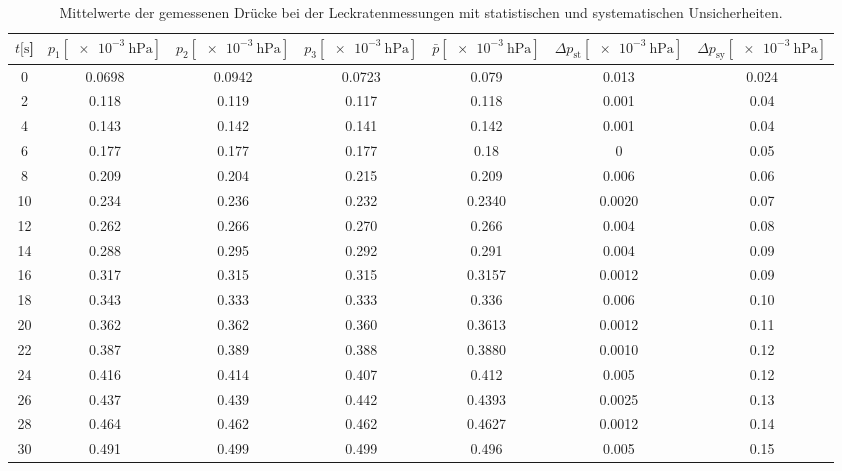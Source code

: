 \begin{table}[H]
  \centering
    \caption{Mittelwerte der gemessenen Drücke bei der Leckratenmessungen mit statistischen und systematischen Unsicherheiten.}
    \label{tab:Turbo_Leck2}
    \small{
    \begin{tabular}{
      S[table-format=3.0] 
      S[table-format=1.4] S[table-format=1.4] S[table-format=1.4]
      S[table-format=1.4] S[table-format=1.4] S[table-format=1.3]
      }
      \toprule
      {$t [\si{\second}$]} &
      {$p_1 [\SI{e-3}{\hecto\pascal}]$} & {$p_2 [\SI{e-3}{\hecto\pascal}]$} & {$p_3 [\SI{e-3}{\hecto\pascal}]$} &
      {$\bar{p} [\SI{e-3}{\hecto\pascal}]$} & {$\Delta p_\text{st} [\SI{e-3}{\hecto\pascal}]$} & {$\Delta p_\text{sy} [\SI{e-3}{\hecto\pascal}]$}\\
         & 0.0698 &  0.0942 &  0.0723 &  0.079  & 0.013  & 0.024  \\
      2   & 0.118  &  0.119  &  0.117  &  0.118  & 0.001  & 0.04   \\
      4   & 0.143  &  0.142  &  0.141  &  0.142  & 0.001  & 0.04   \\
      6   & 0.177  &  0.177  &  0.177  &  0.18   & 0      & 0.05   \\
      8   & 0.209  &  0.204  &  0.215  &  0.209  & 0.006  & 0.06   \\
      10  & 0.234  &  0.236  &  0.232  &  0.2340 & 0.0020 & 0.07   \\
      12  & 0.262  &  0.266  &  0.270  &  0.266  & 0.004  & 0.08   \\
      14  & 0.288  &  0.295  &  0.292  &  0.291  & 0.004  & 0.09   \\
      16  & 0.317  &  0.315  &  0.315  &  0.3157 & 0.0012 & 0.09   \\
      18  & 0.343  &  0.333  &  0.333  &  0.336  & 0.006  & 0.10   \\
      20  & 0.362  &  0.362  &  0.360  &  0.3613 & 0.0012 & 0.11   \\
      22  & 0.387  &  0.389  &  0.388  &  0.3880 & 0.0010 & 0.12   \\
      24  & 0.416  &  0.414  &  0.407  &  0.412  & 0.005  & 0.12   \\
      26  & 0.437  &  0.439  &  0.442  &  0.4393 & 0.0025 & 0.13   \\
      28  & 0.464  &  0.462  &  0.462  &  0.4627 & 0.0012 & 0.14   \\
      30  & 0.491  &  0.499  &  0.499  &  0.496  & 0.005  & 0.15   \\

\end{tabular}}
\end{table}
